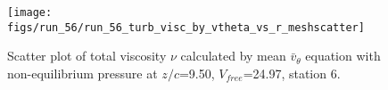 \begin{figure}[H]
\centering
\texttt{[image: figs/run\_56/run\_56\_turb\_visc\_by\_vtheta\_vs\_r\_meshscatter]}
\caption{Scatter plot of total viscosity $\nu$ calculated by mean $\bar{v}_{\theta}$ equation with non-equilibrium pressure at $z/c$=9.50, $V_{free}$=24.97, station 6.}
\label{fig:run_56_turb_visc_by_vtheta_vs_r_meshscatter}
\end{figure}


